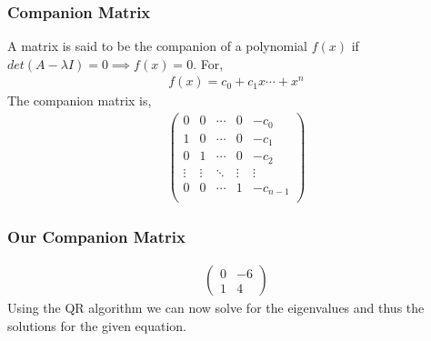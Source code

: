 \documentclass{beamer}
\providecommand{\brak}[1]{\ensuremath{\left(#1\right)}}
\theoremstyle{remark}
\newcommand{\myvec}[1]{\ensuremath{\begin{pmatrix}#1\end{pmatrix}}}
\let\vec\mathbf
\numberwithin{equation}{section}
\begin{document}
\begin{frame}
\frametitle{Companion Matrix}
A matrix is said to be the companion of a polynomial $f\brak{x}$ if 
$det\brak{A - \lambda I} = 0 \implies f\brak{x} = 0$. 
\newline
For,
\begin{align}
  f\brak{x} = c_0 + c_1 x \cdots + x^n
\end{align}
The companion matrix is,
\begin{align}
  \myvec{
    0 & 0 & \cdots & 0 & -c_0\\
    1 & 0 & \cdots & 0 & -c_1\\
    0 & 1 & \cdots & 0 & -c_2\\
    \vdots & \vdots & \ddots & \vdots & \vdots\\
    0 & 0 & \cdots & 1 & -c_{n-1}\\
  }
\end{align}

\end{frame}
\begin{frame}
\frametitle{Our Companion Matrix}
\begin{align}
  \myvec{
    0 & -6\\
    1 & 4
  }
\end{align}
Using the QR algorithm we can now solve for the eigenvalues and thus the solutions 
for the given equation.
\end{frame}
\end{document}

